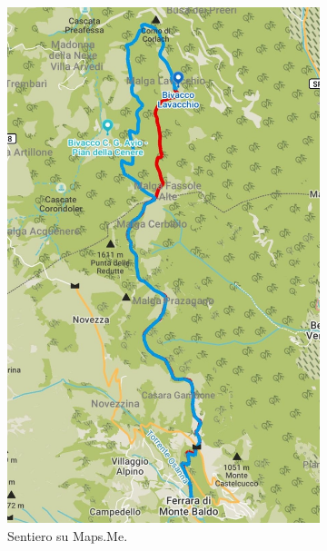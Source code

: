 \documentclass{article}
\begin{document}
\begin{figure}[htbp!]
    \centering
    \begin{subfigure}[t]{0.45\textwidth}
        \centering
        \vspace{0pt} %
        \includegraphics[width=\textwidth]{images/sentiero_mapsMe.jpg}
        \caption{Sentiero su Maps.Me.}
        \label{fig:foto_lunga}
    \end{subfigure}
    \hfill
    \begin{subfigure}[t]{0.45\textwidth}

\end{subfigure}
\end{figure}
\end{document}
